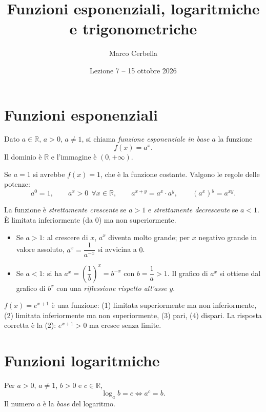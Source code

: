 \documentclass[11pt,a4paper]{article}
\title{Funzioni esponenziali, logaritmiche e trigonometriche}
\author{Marco Cerbella}
\date{Lezione 7 -- 15 ottobre 2026}
\begin{document}
\maketitle

\section{Funzioni esponenziali}

\begin{definizione}
Dato $a \in \mathbb{R}$, $a > 0$, $a \ne 1$, si chiama \emph{funzione esponenziale in base $a$} la funzione
\[
f(x) = a^x .
\]
Il dominio è $\mathbb{R}$ e l'immagine è $(0, +\infty)$.
\end{definizione}

Se $a = 1$ si avrebbe $f(x) = 1$, che è la funzione costante. Valgono le regole delle potenze:
\[
a^0 = 1, \qquad a^x > 0 \ \ \forall x \in \mathbb{R}, \qquad a^{x+y} = a^x \cdot a^y, \qquad (a^x)^y = a^{xy}.
\]

La funzione è \emph{strettamente crescente} se $a > 1$ e \emph{strettamente decrescente} se $a < 1$. È limitata inferiormente (da $0$) ma non superiormente.
\begin{itemize}
    \item Se $a > 1$: al crescere di $x$, $a^x$ diventa molto grande; per $x$ negativo grande in valore assoluto, $a^x = \dfrac{1}{a^{-x}}$ si avvicina a $0$.
    \item Se $a < 1$: si ha $a^x = \left(\dfrac{1}{b}\right)^x = b^{-x}$ con $b = \dfrac{1}{a} > 1$. Il grafico di $a^x$ si ottiene dal grafico di $b^x$ con una \emph{riflessione rispetto all'asse $y$}.
\end{itemize}

\begin{esempio}[Test]
$f(x) = e^{x+1}$ è una funzione: (1) limitata superiormente ma non inferiormente, (2) limitata inferiormente ma non superiormente, (3) pari, (4) dispari. La risposta corretta è la (2): $e^{x+1} > 0$ ma cresce senza limite.
\end{esempio}

\section{Funzioni logaritmiche}

\begin{definizione}[Logaritmo]
Per $a > 0$, $a \ne 1$, $b > 0$ e $c \in \mathbb{R}$,
\[
\log_a b = c \iff a^c = b .
\]
Il numero $a$ è la \emph{base} del logaritmo.
\end{definizione}
\end{document}
